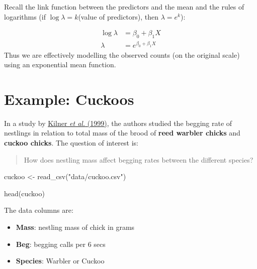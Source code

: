 \documentclass[
]{book}
\newenvironment{Shaded}{\begin{snugshade}}{\end{snugshade}}
\newcommand{\FunctionTok}[1]{\textcolor[rgb]{0.00,0.00,0.00}{#1}}
\newcommand{\NormalTok}[1]{#1}
\newcommand{\OtherTok}[1]{\textcolor[rgb]{0.56,0.35,0.01}{#1}}
\newcommand{\StringTok}[1]{\textcolor[rgb]{0.31,0.60,0.02}{#1}}
\providecommand{\tightlist}{%
  \setlength{\itemsep}{0pt}\setlength{\parskip}{0pt}}
\begin{document}
Recall the link function between the predictors and the mean and the rules of logarithms (if \(\log{\lambda} = k\)(value of predictors), then \(\lambda = e^k\)):

\[
\begin{aligned}
\log{\lambda} & = \beta_0 + \beta_1X \\
\lambda & = e^{\beta_0 + \beta_1X }
\end{aligned}
\]
Thus we are effectively modelling the observed counts (on the original scale) using an exponential mean function.

\hypertarget{example-cuckoos}{%
\section{Example: Cuckoos}\label{example-cuckoos}}

In a study by \href{http://www.nature.com/nature/journal/v397/n6721/abs/397667a0.html}{Kilner \emph{et al.} (1999)}, the authors
studied the begging rate of nestlings in relation to total mass of the brood of \textbf{reed warbler chicks} and \textbf{cuckoo chicks}.
The question of interest is:

\begin{quote}
How does nestling mass affect begging rates between the different species?
\end{quote}

\begin{Shaded}
\begin{Highlighting}[]
\NormalTok{cuckoo }\OtherTok{\textless{}{-}} \FunctionTok{read\_csv}\NormalTok{(}\StringTok{"data/cuckoo.csv"}\NormalTok{)}
\end{Highlighting}
\end{Shaded}

\begin{Shaded}
\begin{Highlighting}[]
\FunctionTok{head}\NormalTok{(cuckoo)}
\end{Highlighting}
\end{Shaded}

The data columns are:

\begin{itemize}
\tightlist
\item
  \textbf{Mass}: nestling mass of chick in grams
\item
  \textbf{Beg}: begging calls per 6 secs
\item
  \textbf{Species}: Warbler or Cuckoo
\end{itemize}
\end{document}
